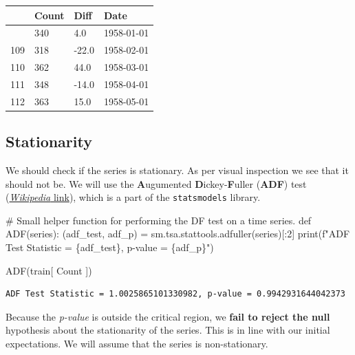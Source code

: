 \documentclass[
  letterpaper,
  DIV=11,
  numbers=noendperiod]{scrartcl}
\newenvironment{Shaded}{\begin{snugshade}}{\end{snugshade}}
\newcommand{\BuiltInTok}[1]{\textcolor[rgb]{0.00,0.23,0.31}{#1}}
\newcommand{\CommentTok}[1]{\textcolor[rgb]{0.37,0.37,0.37}{#1}}
\newcommand{\DecValTok}[1]{\textcolor[rgb]{0.68,0.00,0.00}{#1}}
\newcommand{\KeywordTok}[1]{\textcolor[rgb]{0.00,0.23,0.31}{#1}}
\newcommand{\NormalTok}[1]{\textcolor[rgb]{0.00,0.23,0.31}{#1}}
\newcommand{\OperatorTok}[1]{\textcolor[rgb]{0.37,0.37,0.37}{#1}}
\newcommand{\SpecialCharTok}[1]{\textcolor[rgb]{0.37,0.37,0.37}{#1}}
\newcommand{\SpecialStringTok}[1]{\textcolor[rgb]{0.13,0.47,0.30}{#1}}
\newcommand{\StringTok}[1]{\textcolor[rgb]{0.13,0.47,0.30}{#1}}
\begin{document}
\begin{longtable}[]{@{}llll@{}}
\toprule\noalign{}
& Count & Diff & Date \\
\midrule\noalign{}
\endhead
\bottomrule\noalign{}
\endlastfoot
108 & 340 & 4.0 & 1958-01-01 \\
109 & 318 & -22.0 & 1958-02-01 \\
110 & 362 & 44.0 & 1958-03-01 \\
111 & 348 & -14.0 & 1958-04-01 \\
112 & 363 & 15.0 & 1958-05-01 \\
\end{longtable}

\hypertarget{stationarity}{%
\subsection{Stationarity}\label{stationarity}}

We should check if the series is stationary. As per visual inspection we
see that it should not be. We will use the \textbf{A}ugumented
\textbf{D}ickey-\textbf{F}uller (\textbf{ADF}) test
(\href{https://en.wikipedia.org/wiki/Augmented_Dickey\%E2\%80\%93Fuller_test}{\emph{Wikipedia}
link}), which is a part of the \texttt{statsmodels} library.

\begin{Shaded}
\begin{Highlighting}[]
\CommentTok{\# Small helper function for performing the DF test on a time series. }
\KeywordTok{def}\NormalTok{ ADF(series):}
\NormalTok{    (adf\_test, adf\_p) }\OperatorTok{=}\NormalTok{ sm.tsa.stattools.adfuller(series)[:}\DecValTok{2}\NormalTok{]}
    \BuiltInTok{print}\NormalTok{(}\SpecialStringTok{f"ADF Test Statistic = }\SpecialCharTok{\{}\NormalTok{adf\_test}\SpecialCharTok{\}}\SpecialStringTok{, p{-}value = }\SpecialCharTok{\{}\NormalTok{adf\_p}\SpecialCharTok{\}}\SpecialStringTok{"}\NormalTok{)}

\NormalTok{ADF(train[ }\StringTok{\textquotesingle{}Count\textquotesingle{}}\NormalTok{ ])}
\end{Highlighting}
\end{Shaded}

\begin{verbatim}
ADF Test Statistic = 1.0025865101330982, p-value = 0.9942931644042373
\end{verbatim}

Because the \emph{p-value} is outside the critical region, we
\textbf{fail to reject the null} hypothesis about the stationarity of
the series. This is in line with our initial expectations. We will
assume that the series is non-stationary.
\end{document}
